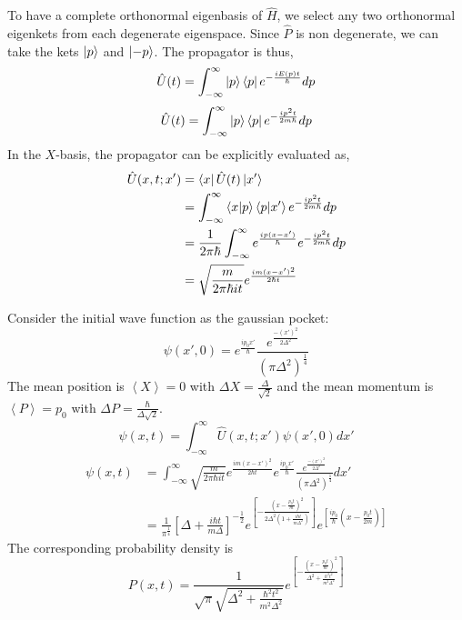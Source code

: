 \documentclass[12pt,a4paper]{report}
\newcommand{\expected}[1]{\left \langle #1 \right \rangle}
\begin{document}
To have a complete orthonormal eigenbasis of $\hat{H}$, we select any two orthonormal eigenkets from each degenerate eigenspace.
Since $\hat{P}$ is non degenerate, we can take the kets $\ket{p}$ and $\ket{-p}$. The propagator is thus,
\begin{equation*}
    \hat{U}(t) = \int_{-\infty}^{\infty} \ket{p}\bra{p} e^{-\frac{iE(p)t}{\hbar}} dp
\end{equation*}
\begin{equation*}
    \hat{U}(t) = \int_{-\infty}^{\infty} \ket{p}\bra{p} e^{-\frac{ip^2t}{2m\hbar}} dp
\end{equation*}
In the $X$-basis, the propagator can be explicitly evaluated as,
\begin{align*}
    \hat{U}(x, t; x') &= \bra{x}\hat{U}(t)\ket{x'} \\
    &= \int_{-\infty}^{\infty} \bra{x}\ket{p}\bra{p}\ket{x'} e^{-\frac{ip^2t}{2m\hbar}} dp \\
    &= \frac{1}{2\pi\hbar}\int_{-\infty}^{\infty} e^{\frac{ip(x-x')}{\hbar}} e^{-\frac{ip^2t}{2m\hbar}} dp \\
    &= \sqrt{\frac{m}{2\pi\hbar it}} e^{\frac{im(x-x')^2}{2\hbar t}}
\end{align*}

Consider the initial wave function as the gaussian pocket:
\begin{equation*}
    \psi(x', 0) = e^{\frac{ip_0x'}{\hbar}} \frac{e^{\frac{-(x')^2}{2\Delta^2}}}{(\pi\Delta^2)^{\frac{1}{4}}}
\end{equation*}
The mean position is $\expected{X} = 0$ with $\Delta X = \frac{\Delta}{\sqrt{2}}$ and the mean momentum is $\expected{P} = p_0$ with $\Delta P = \frac{\hbar}{\Delta \sqrt{2}}$.
\begin{equation*}
    \psi(x, t) = \int_{-\infty}^{\infty} \hat{U}(x, t; x') \psi(x', 0) dx'
\end{equation*}
\begin{align*}
    \psi(x, t) &= \int_{-\infty}^{\infty} \sqrt{\frac{m}{2\pi\hbar it}} e^{\frac{im(x-x')^2}{2\hbar t}} e^{\frac{ip_0x'}{\hbar}} \frac{e^{\frac{-(x')^2}{2\Delta^2}}}{(\pi\Delta^2)^{\frac{1}{4}}} dx' \\
    &= \frac{1}{\pi^{\frac{1}{4}}} \left[ \Delta + \frac{i\hbar t}{m\Delta} \right]^{-\frac{1}{2}} e^{\left[ -\frac{\left(x-\frac{p_0t}{m}\right)^2}{2\Delta^2\left(1+\frac{i\hbar t}{m\Delta^2}\right)} \right]} e^{\left[ \frac{ip_0}{\hbar} \left( x-\frac{p_0t}{2m} \right) \right]}
\end{align*}
The corresponding probability density is
\begin{equation*}
    P(x, t) = \frac{1}{\sqrt{\pi} \sqrt{\Delta^2 + \frac{\hbar^2 t^2}{m^2 \Delta^2}}} e^{\left[ -\frac{\left(x-\frac{p_0t}{m}\right)^2}{\Delta^2 + \frac{\hbar^2t^2}{m^2\Delta^2}} \right]}
\end{equation*}
\end{document}
